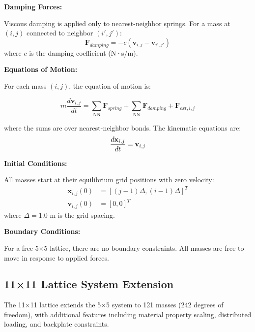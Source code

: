 \documentclass[11pt,a4paper]{article}
\begin{document}
\noindent \textbf{Damping Forces:}

\noindent Viscous damping is applied only to nearest-neighbor springs. For a mass at $(i, j)$ connected to neighbor $(i', j')$:
\begin{equation}
\mathbf{F}_{damping} = -c (\mathbf{v}_{i,j} - \mathbf{v}_{i',j'})
\label{eq:damping_force}
\end{equation}
where $c$ is the damping coefficient (N·s/m). \newline

\noindent \textbf{Equations of Motion:}

\noindent For each mass $(i, j)$, the equation of motion is:

\begin{equation}
m \frac{d\mathbf{v}_{i,j}}{dt} = \sum_{\text{NN}} \mathbf{F}_{spring} + \sum_{\text{NN}} \mathbf{F}_{damping} + \mathbf{F}_{ext,i,j}
\label{eq:lattice_motion}
\end{equation}

\noindent where the sums are over nearest-neighbor bonds. The kinematic equations are:
\begin{equation}
\frac{d\mathbf{x}_{i,j}}{dt} = \mathbf{v}_{i,j} \newline
\end{equation}

\noindent \textbf{Initial Conditions:}

\noindent All masses start at their equilibrium grid positions with zero velocity:
\begin{align}
\mathbf{x}_{i,j}(0) &= [(j-1) \Delta, (i-1) \Delta]^T \\
\mathbf{v}_{i,j}(0) &= [0, 0]^T
\end{align}
\noindent where $\Delta = 1.0$ m is the grid spacing. \newline

\noindent \textbf{Boundary Conditions:}

\noindent For a free 5×5 lattice, there are no boundary constraints. All masses are free to move in response to applied forces.

\subsection{11×11 Lattice System Extension}
\label{subsec:11x11_system}

\noindent The 11×11 lattice extends the 5×5 system to 121 masses (242 degrees of freedom), with additional features including material property scaling, distributed loading, and backplate constraints. \newline
\end{document}
